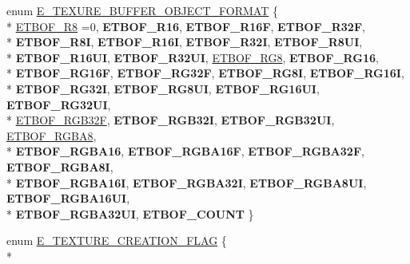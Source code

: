 \begin{DoxyCompactItemize}
\item 
enum \hyperlink{namespaceirr_1_1video_af88aeae2a719e32f6325a6636516b3a2}{E\+\_\+\+T\+E\+X\+U\+R\+E\+\_\+\+B\+U\+F\+F\+E\+R\+\_\+\+O\+B\+J\+E\+C\+T\+\_\+\+F\+O\+R\+M\+AT} \{ \\*
\hyperlink{namespaceirr_1_1video_af88aeae2a719e32f6325a6636516b3a2ace2069fc84e8465d5bca2bdcd1b85918}{E\+T\+B\+O\+F\+\_\+\+R8} =0, 
{\bfseries E\+T\+B\+O\+F\+\_\+\+R16}, 
{\bfseries E\+T\+B\+O\+F\+\_\+\+R16F}, 
{\bfseries E\+T\+B\+O\+F\+\_\+\+R32F}, 
\\*
{\bfseries E\+T\+B\+O\+F\+\_\+\+R8I}, 
{\bfseries E\+T\+B\+O\+F\+\_\+\+R16I}, 
{\bfseries E\+T\+B\+O\+F\+\_\+\+R32I}, 
{\bfseries E\+T\+B\+O\+F\+\_\+\+R8\+UI}, 
\\*
{\bfseries E\+T\+B\+O\+F\+\_\+\+R16\+UI}, 
{\bfseries E\+T\+B\+O\+F\+\_\+\+R32\+UI}, 
\hyperlink{namespaceirr_1_1video_af88aeae2a719e32f6325a6636516b3a2a5a22d8838a8f72fa3929ea818753fe5c}{E\+T\+B\+O\+F\+\_\+\+R\+G8}, 
{\bfseries E\+T\+B\+O\+F\+\_\+\+R\+G16}, 
\\*
{\bfseries E\+T\+B\+O\+F\+\_\+\+R\+G16F}, 
{\bfseries E\+T\+B\+O\+F\+\_\+\+R\+G32F}, 
{\bfseries E\+T\+B\+O\+F\+\_\+\+R\+G8I}, 
{\bfseries E\+T\+B\+O\+F\+\_\+\+R\+G16I}, 
\\*
{\bfseries E\+T\+B\+O\+F\+\_\+\+R\+G32I}, 
{\bfseries E\+T\+B\+O\+F\+\_\+\+R\+G8\+UI}, 
{\bfseries E\+T\+B\+O\+F\+\_\+\+R\+G16\+UI}, 
{\bfseries E\+T\+B\+O\+F\+\_\+\+R\+G32\+UI}, 
\\*
\hyperlink{namespaceirr_1_1video_af88aeae2a719e32f6325a6636516b3a2a0a374f363f5a3f97881f54ebc14b65ef}{E\+T\+B\+O\+F\+\_\+\+R\+G\+B32F}, 
{\bfseries E\+T\+B\+O\+F\+\_\+\+R\+G\+B32I}, 
{\bfseries E\+T\+B\+O\+F\+\_\+\+R\+G\+B32\+UI}, 
\hyperlink{namespaceirr_1_1video_af88aeae2a719e32f6325a6636516b3a2ac1e8e4ab21e82bead40e9935fea1043d}{E\+T\+B\+O\+F\+\_\+\+R\+G\+B\+A8}, 
\\*
{\bfseries E\+T\+B\+O\+F\+\_\+\+R\+G\+B\+A16}, 
{\bfseries E\+T\+B\+O\+F\+\_\+\+R\+G\+B\+A16F}, 
{\bfseries E\+T\+B\+O\+F\+\_\+\+R\+G\+B\+A32F}, 
{\bfseries E\+T\+B\+O\+F\+\_\+\+R\+G\+B\+A8I}, 
\\*
{\bfseries E\+T\+B\+O\+F\+\_\+\+R\+G\+B\+A16I}, 
{\bfseries E\+T\+B\+O\+F\+\_\+\+R\+G\+B\+A32I}, 
{\bfseries E\+T\+B\+O\+F\+\_\+\+R\+G\+B\+A8\+UI}, 
{\bfseries E\+T\+B\+O\+F\+\_\+\+R\+G\+B\+A16\+UI}, 
\\*
{\bfseries E\+T\+B\+O\+F\+\_\+\+R\+G\+B\+A32\+UI}, 
{\bfseries E\+T\+B\+O\+F\+\_\+\+C\+O\+U\+NT}
 \}
\item 
enum \hyperlink{namespaceirr_1_1video_acaf6f7414534f7d62bff18c5bf11876f}{E\+\_\+\+T\+E\+X\+T\+U\+R\+E\+\_\+\+C\+R\+E\+A\+T\+I\+O\+N\+\_\+\+F\+L\+AG} \{ \\*

\end{DoxyCompactItemize}
